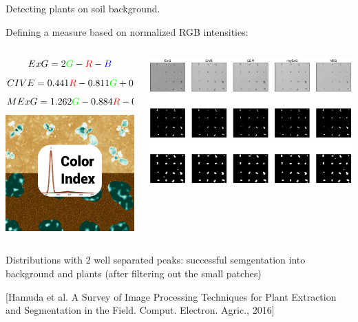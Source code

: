 \begin{frame}{Detecting plants on soil background.}

Defining a measure based on normalized RGB intensities:
\begin{columns}
\begin{column}{0.3\textwidth}

{\tiny
$$ExG=2{\color{green}G}-{\color{red}R}-{\color{blue}B}$$
$$CIVE = 0.441{\color{red}R} - 0.811{\color{green}G} + 0.385{\color{blue}B} + 18.787$$
$$MExG=1.262{\color{green}G}-0.884{\color{red}R}-0.311{\color{blue}B}$$}
\includegraphics[width=\linewidth]{pics/seg}
\end{column}
\begin{column}{0.69\textwidth}
\begin{center}
\includegraphics[width=\linewidth]{pics/cidx}
\end{center}
\end{column}
\end{columns}

Distributions with 2 well separated peaks: successful semgentation into background and plants (after filtering out the small patches)

{\tiny [Hamuda et al. A Survey of Image Processing Techniques for Plant Extraction and Segmentation in the Field. Comput. Electron. Agric., 2016]}

\end{frame}

